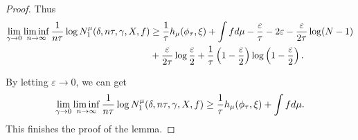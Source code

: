\documentclass[10pt,a4paper]{amsart}
\begin{document}
\begin{proof}
\noindent
Thus
\[
\begin{aligned}
\lim_{\gamma\to 0} \liminf_{n \to \infty} \frac{1}{n\tau} \log N_1^\mu(\delta, n\tau, \gamma, X, f) &\geq \frac{1}{\tau} h_\mu(\phi_\tau, \xi) + \int f {\rm d}\mu - \frac{\varepsilon}{\tau} - 2\varepsilon -\frac{\varepsilon}{2\tau} \log(N - 1) \\
&+ \frac{\varepsilon}{2\tau} \log \frac{\varepsilon}{2} +\frac{1}{\tau} \left( 1 - \frac{\varepsilon}{2} \right) \log \left( 1 - \frac{\varepsilon}{2} \right).
\end{aligned}
\]

\noindent
By letting \( \varepsilon \to 0 \), we can get
\[
\lim_{\gamma\to 0} \liminf_{n \to \infty} \frac{1}{n\tau} \log N_1^\mu(\delta, n\tau, \gamma, X, f) \geq \frac{1}{\tau} h_\mu(\phi_\tau, \xi) + \int f {\rm d}\mu.
\]
This finishes the proof of the lemma.
\end{proof}
\end{document}
